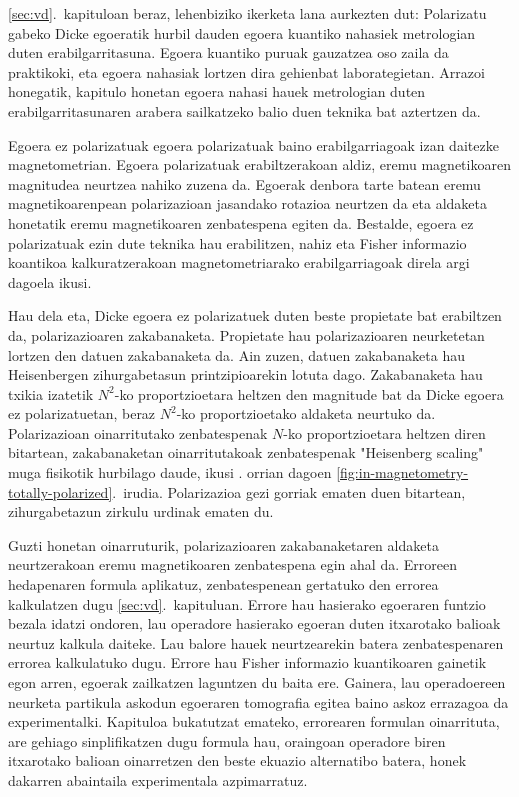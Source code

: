 \ref{sec:vd}.~kapituloan beraz, lehenbiziko ikerketa lana aurkezten dut: Polarizatu gabeko Dicke egoeratik hurbil dauden egoera kuantiko nahasiek metrologian duten erabilgarritasuna.
Egoera kuantiko puruak gauzatzea oso zaila da praktikoki, eta egoera nahasiak lortzen dira gehienbat laborategietan.
Arrazoi honegatik, kapitulo honetan egoera nahasi hauek metrologian duten erabilgarritasunaren arabera sailkatzeko balio duen teknika bat aztertzen da.

Egoera ez polarizatuak egoera polarizatuak baino erabilgarriagoak izan daitezke magnetometrian.
Egoera polarizatuak erabiltzerakoan aldiz, eremu magnetikoaren magnitudea neurtzea nahiko zuzena da.
Egoerak denbora tarte batean eremu magnetikoarenpean polarizazioan jasandako  rotazioa neurtzen da eta aldaketa honetatik eremu magnetikoaren zenbatespena egiten da.
Bestalde, egoera ez polarizatuak ezin dute teknika hau erabilitzen, nahiz eta Fisher informazio koantikoa kalkuratzerakoan magnetometriarako erabilgarriagoak direla argi dagoela ikusi.

Hau dela eta, Dicke egoera ez polarizatuek duten beste propietate bat erabiltzen da, polarizazioaren zakabanaketa.
Propietate hau polarizazioaren neurketetan lortzen den datuen zakabanaketa da.
Ain zuzen, datuen zakabanaketa hau Heisenbergen zihurgabetasun printzipioarekin lotuta dago.
Zakabanaketa hau txikia izatetik $N^2$-ko proportzioetara heltzen den magnitude bat da Dicke egoera ez polarizatuetan, beraz $N^2$-ko proportzioetako aldaketa neurtuko da.
Polarizazioan oinarritutako zenbatespenak $N$-ko proportzioetara heltzen diren bitartean, zakabanaketan oinarritutakoak zenbatespenak "Heisenberg scaling" muga fisikotik hurbilago daude, ikusi \pageref{fig:in-magnetometry-totally-polarized}. orrian dagoen \ref{fig:in-magnetometry-totally-polarized}.~irudia.
Polarizazioa gezi gorriak ematen duen bitartean, zihurgabetazun zirkulu urdinak ematen du.

Guzti honetan oinarruturik, polarizazioaren zakabanaketaren aldaketa neurtzerakoan eremu magnetikoaren zenbatespena egin ahal da.
Erroreen hedapenaren formula aplikatuz, zenbatespenean gertatuko den errorea kalkulatzen dugu \ref{sec:vd}.~kapituluan.
Errore hau hasierako egoeraren funtzio bezala idatzi ondoren, lau operadore hasierako egoeran duten itxarotako balioak neurtuz kalkula daiteke.
Lau balore hauek neurtzearekin batera zenbatespenaren errorea kalkulatuko dugu.
Errore hau Fisher informazio kuantikoaren gainetik egon arren, egoerak zailkatzen laguntzen du baita ere.
Gainera, lau operadoereen neurketa partikula askodun egoeraren tomografia egitea baino askoz errazagoa da experimentalki.
Kapituloa bukatutzat emateko, errorearen formulan oinarrituta, are gehiago sinplifikatzen dugu formula hau, oraingoan operadore biren itxarotako balioan oinarretzen den beste ekuazio alternatibo batera, honek dakarren abaintaila experimentala azpimarratuz.

